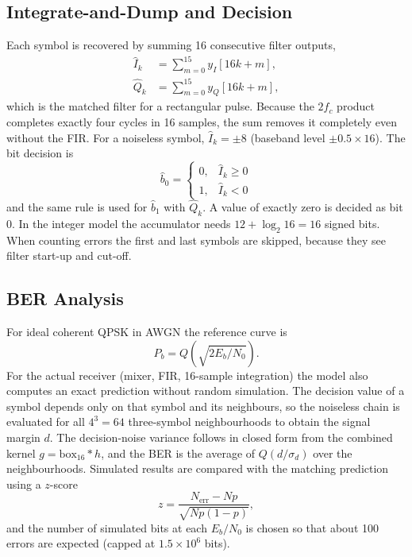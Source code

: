 \documentclass[10pt,twocolumn,letterpaper]{article}
\begin{document}
\subsection{Integrate-and-Dump and Decision}

Each symbol is recovered by summing 16 consecutive filter outputs,
\begin{align}
\hat I_k&=\sum_{m=0}^{15} y_I[16k+m],\\
\hat Q_k&=\sum_{m=0}^{15} y_Q[16k+m],
\end{align}
which is the matched filter for a rectangular pulse. Because the $2f_c$
product completes exactly four cycles in 16 samples, the sum removes it
completely even without the FIR. For a noiseless symbol, $\hat I_k=\pm8$
(baseband level $\pm0.5\times16$). The bit decision is
\begin{equation}
\hat b_0=\begin{cases}0,&\hat I_k\ge 0\\1,&\hat I_k<0\end{cases}
\end{equation}
and the same rule is used for $\hat b_1$ with $\hat Q_k$. A value of exactly
zero is decided as bit 0. In the integer model the
accumulator needs $12+\log_2 16=16$ signed bits. When counting errors the
first and last symbols are skipped, because they see filter start-up and
cut-off.

\subsection{BER Analysis}

For ideal coherent QPSK in AWGN the reference curve is
\begin{equation}
P_b=Q\!\left(\sqrt{2E_b/N_0}\right).
\end{equation}
For the actual receiver (mixer, FIR, 16-sample integration) the model also
computes an exact prediction without random simulation. The decision value of
a symbol depends only on that symbol and its neighbours, so the noiseless
chain is evaluated for all $4^3=64$ three-symbol neighbourhoods to obtain the
signal margin $d$. The decision-noise variance follows in closed form from the
combined kernel $g=\mathrm{box}_{16}\ast h$, and the BER is the average of
$Q(d/\sigma_d)$ over the neighbourhoods. Simulated results are compared with
the matching prediction using a $z$-score
\begin{equation}
z=\frac{N_{\mathrm{err}}-N p}{\sqrt{Np(1-p)}},
\end{equation}
and the number of simulated bits
at each $E_b/N_0$ is chosen so that about 100 errors are expected (capped at
$1.5\times10^6$ bits).
\end{document}
